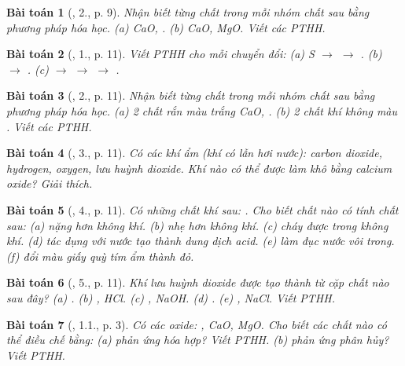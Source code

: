 \documentclass{article}
\newtheorem{baitoan}{Bài toán}
\begin{document}
\begin{baitoan}[\cite{SGK_Hoa_Hoc_9}, 2., p. 9]
	Nhận biết từng chất trong mỗi nhóm chất sau bằng phương pháp hóa học. (a) \emph{CaO, }. (b) \emph{CaO, MgO}. Viết các PTHH.
\end{baitoan}

\begin{baitoan}[\cite{SGK_Hoa_Hoc_9}, 1., p. 11]
	Viết PTHH cho mỗi chuyển đổi: (a) \emph{S $\to$  $\to$ }. (b) \emph{ $\to$ }. (c) \emph{ $\to$  $\to$  $\to$ }.
\end{baitoan}

\begin{baitoan}[\cite{SGK_Hoa_Hoc_9}, 2., p. 11]
	Nhận biết từng chất trong mỗi nhóm chất sau bằng phương pháp hóa học. (a) 2 chất rắn màu trắng \emph{CaO, }. (b) 2 chất khí không màu \emph{}. Viết các PTHH.
\end{baitoan}

\begin{baitoan}[\cite{SGK_Hoa_Hoc_9}, 3., p. 11]
	Có các khí ẩm (khí có lẫn hơi nước): carbon dioxide, hydrogen, oxygen, lưu huỳnh dioxide. Khí nào có thể được làm khô bằng calcium oxide? Giải thích.
\end{baitoan}

\begin{baitoan}[\cite{SGK_Hoa_Hoc_9}, 4., p. 11]
	Có những chất khí sau: \emph{}. Cho biết chất nào có tính chất sau: (a) nặng hơn không khí. (b) nhẹ hơn không khí. (c) cháy được trong không khí. (d) tác dụng với nước tạo thành dung dịch acid. (e) làm đục nước vôi trong. (f) đổi màu giấy quỳ tím ẩm thành đỏ.
\end{baitoan}

\begin{baitoan}[\cite{SGK_Hoa_Hoc_9}, 5., p. 11]
	Khí lưu huỳnh dioxide được tạo thành từ cặp chất nào sau đây? (a) \emph{}. (b) \emph{, HCl}. (c) \emph{, NaOH}. (d) \emph{}. (e) \emph{, NaCl}. Viết PTHH.
\end{baitoan}

\begin{baitoan}[\cite{SBT_Hoa_Hoc_9}, 1.1., p. 3]
	Có các oxide: \emph{, CaO, MgO}. Cho biết các chất nào có thể điều chế bằng: (a) phản ứng hóa hợp? Viết PTHH. (b) phản ứng phân hủy? Viết PTHH.
\end{baitoan}
\end{document}
